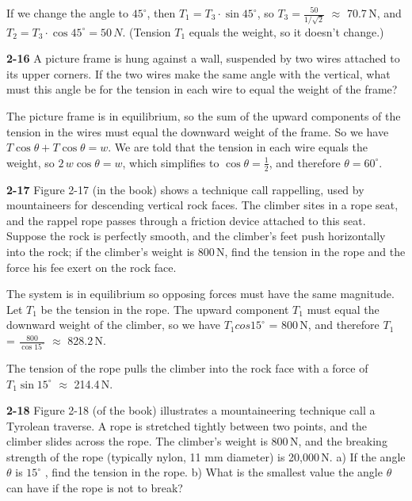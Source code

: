 \documentclass{amsart}
\begin{document}
If we change the angle to $45^\circ$, then $T_1 = T_3 \cdot \sin 45^\circ$,
so $T_3 = \frac{50}{1/\sqrt{2}}$ $\approx$ 70.7\,N,
and $T_2 = T_3 \cdot \cos 45^\circ = 50\,N$.
(Tension $T_1$ equals the weight, so it doesn't change.)

\vspace{\baselineskip}
\noindent
\textbf{2-16} A picture frame is hung against a wall, suspended by two wires
attached to its upper corners.
If the two wires make the same angle with the vertical,
what must this angle be for the tension in each wire to equal the weight of the frame?

The picture frame is in equilibrium, so the sum of the upward components of the tension in the wires
must equal the downward weight of the frame.  So we have $T \cos \theta + T \cos \theta = w$.
We are told that the tension in each wire equals the weight, so $2\,w \cos \theta = w$,
which simplifies to $\cos \theta = \frac{1}{2}$, and therefore $\theta = 60^\circ$.

\vspace{\baselineskip}
\noindent
\textbf{2-17} Figure 2-17 (in the book) shows a technique call rappelling, used by mountaineers
for descending vertical rock faces.
The climber sites in a rope seat, and the rappel rope passes through a friction device attached
to this seat.
Suppose the rock is perfectly smooth, and the climber's feet push horizontally into the rock;
if the climber's weight is 800\,N, find the tension in the rope and the force his fee exert
on the rock face.

The system is in equilibrium so opposing forces must have the same magnitude.
Let $T_1$ be the tension in the rope.  The upward component $T_1$ must equal the downward
weight of the climber, so we have $T_1 cos 15^\circ$ = 800\,N,
and therefore $T_1$ = $\frac{800}{\cos 15^\circ}$ $\approx$ 828.2\,N.

The tension of the rope pulls the climber into the rock face with a force of $T_1 \sin 15^\circ$
$\approx$ 214.4\,N.

\vspace{\baselineskip}
\noindent
\textbf{2-18} Figure 2-18 (of the book) illustrates a mountaineering technique call a Tyrolean traverse.
A rope is stretched tightly between two points, and the climber slides across the rope.
The climber's weight is 800\,N, and the breaking strength of the rope (typically nylon, 11 mm diameter)
is 20,000\,N.\newline
a) If the angle $\theta$ is $15^\circ$ , find the tension in the rope.\newline
b) What is the smallest value the angle $\theta$ can have if the rope is not to break?
\end{document}
